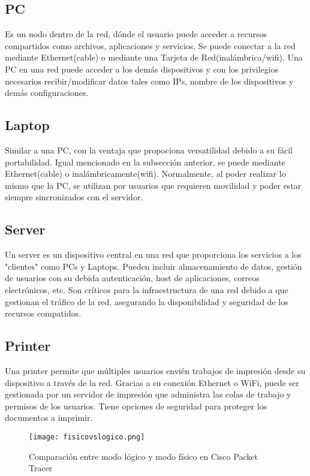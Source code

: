 \documentclass{article}
\begin{document}
\subsection{PC}
Es un nodo dentro de la red, dónde el usuario puede acceder a recursos compartidos como archivos, aplicaciones y servicios. Se puede conectar a la red mediante Ethernet(cable) o mediante una Tarjeta de Red(inalámbrica/wifi). Una PC en una red puede acceder a los demás dispositivos y con los privilegios necesarios recibir/modificar datos tales como IPs, nombre de los dispositivos y demás configuraciones.

\subsection{Laptop}
Similar a una PC, con la ventaja que propociona versatilidad debido a su fácil portabilidad. Igual mencionado en la subsección anterior, se puede mediante Ethernet(cable) o inalámbricamente(wifi). Normalmente, al poder realizar lo mismo que la PC, se utilizan por usuarios que requieren movilidad y poder estar siempre sincronizados con el servidor.

\subsection{Server}
Un server es un dispositivo central en una red que proporciona los servicios a los "clientes" como PCs y Laptops. Pueden incluir almacenamiento de datos, gestión de usuarios con su debida autenticación, host de aplicaciones, correos electrónicos, etc.
Son críticos para la infraestructura de una red debido a que gestionan el tráfico de la red, asegurando la disponibilidad y seguridad de los recursos compatidos. 
\subsection{Printer}
Una printer permite que múltiples usuarios envién trabajos de impresión desde su dispositivo a través de la red. Gracias a su conexión Ethernet o WiFi, puede ser gestionada por un servidor de impresión que administra las colas de trabajo y permisos de los usuarios. Tiene opciones de seguridad para proteger los documentos a imprimir.

\begin{figure}
\centering
\texttt{[image: fisicovslogico.png]}
\caption{\label{fig:physicalvslogical}Comparación entre modo lógico y modo físico en Cisco Packet Tracer}
\end{figure}
\end{document}
